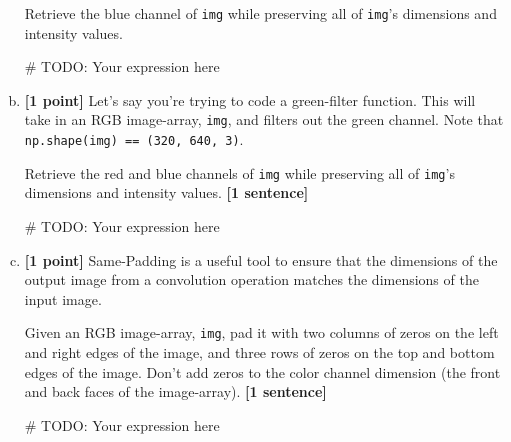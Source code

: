 \documentclass[11pt]{article}
\begin{document}
\begin{enumerate}[(a)]
    \begin{tcolorbox}[colback=orange!5!white,colframe=orange!75!black]
    Retrieve the blue channel of \texttt{img} while preserving all of \texttt{img}'s dimensions and intensity values.
    \end{tcolorbox}
    
    \begin{tcolorbox}[colback=white!5!white,colframe=green!75!black,height=2cm]
    \begin{python}
    # TODO: Your expression here
    \end{python}
    \end{tcolorbox}
    
    \item \textbf{[1 point]} Let's say you're trying to code a green-filter function. This will take in an RGB image-array, \texttt{img}, and filters out the green channel. Note that \texttt{np.shape(img) == (320, 640, 3)}. 
    
    \begin{tcolorbox}[colback=orange!5!white,colframe=orange!75!black]
    Retrieve the red and blue channels of \texttt{img} while preserving all of \texttt{img}'s dimensions and intensity values. \textbf{[1 sentence]}
    \end{tcolorbox}
    
    \begin{tcolorbox}[colback=white!5!white,colframe=green!75!black,height=2cm]
    \begin{python}
    # TODO: Your expression here
    \end{python}
    \end{tcolorbox}
    
    \item \textbf{[1 point]} Same-Padding is a useful tool to ensure that the dimensions of the output image from a convolution operation matches the dimensions of the input image. 
    
    \begin{tcolorbox}[colback=orange!5!white,colframe=orange!75!black]
    Given an RGB image-array, \texttt{img}, pad it with two columns of zeros on the left and right edges of the image, and three rows of zeros on the top and bottom edges of the image. Don't add zeros to the color channel dimension (the front and back faces of the image-array). \textbf{[1 sentence]}
    \end{tcolorbox}
    
    \begin{tcolorbox}[colback=white!5!white,colframe=green!75!black,height=2cm]
    \begin{python}
    # TODO: Your expression here
    \end{python}
    \end{tcolorbox}
    
\end{enumerate}
\end{document}
